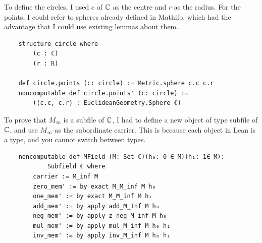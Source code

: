 To define the circles, I used $c$ of $\mathbb{C}$ as the centre and $r$ as the radius. 
For the points, I could refer to spheres already defined in Mathilb, which had the advantage that I could use existing lemmas about them. 
\begin{lstlisting}
    structure circle where
        (c : ℂ)
        (r : ℝ)

    def circle.points (c: circle) := Metric.sphere c.c c.r
    noncomputable def circle.points' (c: circle) := 
        (⟨c.c, c.r⟩ : EuclideanGeometry.Sphere ℂ)
\end{lstlisting}

To prove that $M_{\infty}$ is a subfile of $\mathbb{C}$, I had to define a new object of type subfile of $\mathbb{C}$, and use $M_{\infty}$ as the subordinate carrier.
This is because each object in Lean is a type, and you cannot switch between types.
\begin{lstlisting}
    noncomputable def MField (M: Set ℂ)(h₀: 0 ∈ M)(h₁: 1∈ M):
            Subfield ℂ where
        carrier := M_inf M
        zero_mem' := by exact M_M_inf M h₀
        one_mem' := by exact M_M_inf M h₁
        add_mem' := by apply add_M_Inf M h₀
        neg_mem' := by apply z_neg_M_inf M h₀
        mul_mem' := by apply mul_M_inf M h₀ h₁
        inv_mem' := by apply inv_M_inf M h₀ h₁
\end{lstlisting}

